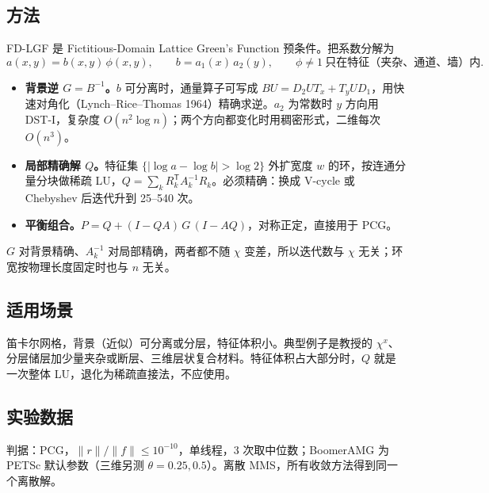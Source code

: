 \documentclass[11pt,a4paper]{ctexart}
\begin{document}
\subsection{方法}
FD-LGF 是 Fictitious-Domain Lattice Green's Function 预条件。把系数分解为
\[
  a(x,y)=b(x,y)\,\phi(x,y),\qquad b=a_1(x)\,a_2(y),\qquad \phi\ne1\ \text{只在特征（夹杂、通道、墙）内}.
\]
\begin{itemize}
\item \textbf{背景逆 $G=B^{-1}$。}$b$ 可分离时，通量算子可写成 $BU=D_2UT_x+T_yUD_1$，用快速对角化（Lynch--Rice--Thomas 1964）精确求逆。$a_2$ 为常数时 $y$ 方向用 DST-I，复杂度 $O(n^2\log n)$；两个方向都变化时用稠密形式，二维每次 $O(n^3)$。
\item \textbf{局部精确解 $Q$。}特征集 $\{|\log a-\log b|>\log2\}$ 外扩宽度 $w$ 的环，按连通分量分块做稀疏 LU，$Q=\sum_kR_k^{\mathsf T}A_k^{-1}R_k$。必须精确：换成 V-cycle 或 Chebyshev 后迭代升到 25--540 次。
\item \textbf{平衡组合。}$P=Q+(I-QA)\,G\,(I-AQ)$，对称正定，直接用于 PCG。
\end{itemize}
$G$ 对背景精确、$A_k^{-1}$ 对局部精确，两者都不随 $\chi$ 变差，所以迭代数与 $\chi$ 无关；环宽按物理长度固定时也与 $n$ 无关。

\subsection{适用场景}
笛卡尔网格，背景（近似）可分离或分层，特征体积小。典型例子是教授的 $\chi^x$、分层储层加少量夹杂或断层、三维层状复合材料。特征体积占大部分时，$Q$ 就是一次整体 LU，退化为稀疏直接法，不应使用。

\subsection{实验数据}
判据：PCG，$\|r\|/\|f\|\le10^{-10}$，单线程，3 次取中位数；BoomerAMG 为 PETSc 默认参数（三维另测 $\theta=0.25,0.5$）。离散 MMS，所有收敛方法得到同一个离散解。
\end{document}
